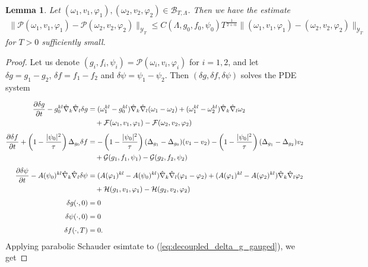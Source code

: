 \documentclass{amsart}
\newtheorem{lemma}[theorem]{Lemma}
\theoremstyle{definition}
\theoremstyle{remark}
\numberwithin{equation}{section}
\newcommand{\D}[2]{\frac{\partial #1}{\partial #2}}
\begin{document}
	



\medskip
\begin{lemma}
	Let $(\omega_1, v_1,\varphi_1), (\omega_2, v_2,\varphi_2)\in\mathcal{B}_{T,\Lambda}$. Then we have the estimate
	\begin{align*}
		\|\mathcal{P}(\omega_1, v_1,\varphi_1) - \mathcal{P}(\omega_2, v_2,\varphi_2)\|_{\mathcal{Y}_T} \leq C(\Lambda,g_0,f_0,\psi_0) T^{\frac{1}{2+\alpha}} \|(\omega_1, v_1,\varphi_1) - (\omega_2, v_2,\varphi_2)\|_{\mathcal{Y}_T}
	\end{align*}
	for $T>0$ sufficiently small.
\end{lemma}

\begin{proof}
	Let us denote $(g_i, f_i,\psi_i) = \mathcal{P}(\omega_i,v_i,\varphi_i)$ for $i=1,2$, and let $\delta g = g_1-g_2$, $\delta f = f_1-f_2$ and $\delta\psi = \psi_1-\psi_2$. 	 Then $(\delta g, \delta f, \delta\psi)$ solves the PDE system
	
		\begin{align}
			\label{eq:decoupled_delta_g_gauged}\D{\delta g}{t} - g_0^{kl}\hat{\nabla}_k\hat{\nabla}_l \delta g & = (\omega_1^{kl}-g_0^{kl})\hat{\nabla}_k\hat{\nabla}_l(\omega_1 - \omega_2) + (\omega_1^{kl}-\omega_2^{kl})\hat{\nabla}_k\hat{\nabla}_l\omega_2\\
			&\notag\quad  + \mathcal{F}(\omega_1, v_1,\varphi_1) - \mathcal{F}(\omega_2, v_2,\varphi_2)\\[1ex]
			\label{eq:decoupled_delta_u_gauged}\D{\delta f}{t}+ \left( 1 - \frac{|\psi_0|^2}{\tau}\right)\Delta_{g_0} \delta f & = -\left( 1 - \frac{|\psi_0|^2}{\tau}\right)(\Delta_{g_1}  - \Delta_{g_0} )(v_1 - v_2)    -\left( 1 - \frac{|\psi_0|^2}{\tau}\right)(\Delta_{g_1}  - \Delta_{g_2} ) v_2 \\
			&\notag\quad + \mathcal{G}(g_1,f_1,\psi_1) -  \mathcal{G}(g_2,f_2,\psi_2)\\[1ex]
			\label{eq:decoupled_delta_psi_gauged}\D{\delta \psi}{t} - A(\psi_0)^{kl}\hat{\nabla}_k\hat{\nabla}_l\delta \psi & = (A(\varphi_1)^{kl} - A(\psi_0)^{kl})\hat{\nabla}_k\hat{\nabla}_l (\varphi_1 - \varphi_2) + (A(\varphi_1)^{kl} - A(\varphi_2)^{kl})\hat{\nabla}_k\hat{\nabla}_l \varphi_2\\
			&\notag\quad  + \mathcal{H}(g_1, v_1,\varphi_1) -  \mathcal{H}(g_2,v_2,\varphi_2)\\[1ex] 
			\notag \delta g(\cdot,0) &= 0\\[1ex]
			\notag \delta \psi(\cdot,0) &= 0\\[1ex]
			\notag \delta f(\cdot,T) &= 0.
	\end{align}
 Applying parabolic Schauder esimtate to (\ref{eq:decoupled_delta_g_gauged}), we get


\end{proof}
\end{document}
